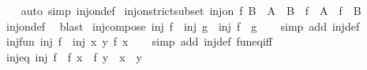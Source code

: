 \begin{isabellebody}
%
\isadelimproof
\ \ %
\endisadelimproof
%
\isatagproof
{}\isamarkupfalse%
\ {\isacharparenleft}{\kern0pt}auto\ simp{\isacharcolon}{\kern0pt}\ inj{\isacharunderscore}{\kern0pt}on{\isacharunderscore}{\kern0pt}def{\isacharparenright}{\kern0pt}%
\endisatagproof
{\isafoldproof}%
%
\isadelimproof
\isanewline
%
\endisadelimproof
\isanewline
{}\isamarkupfalse%
\ inj{\isacharunderscore}{\kern0pt}on{\isacharunderscore}{\kern0pt}strict{\isacharunderscore}{\kern0pt}subset{\isacharcolon}{\kern0pt}\ {\isachardoublequoteopen}inj{\isacharunderscore}{\kern0pt}on\ f\ B\ {\isasymLongrightarrow}\ A\ {\isasymsubset}\ B\ {\isasymLongrightarrow}\ f\ {\isacharbackquote}{\kern0pt}\ A\ {\isasymsubset}\ f\ {\isacharbackquote}{\kern0pt}\ B{\isachardoublequoteclose}\isanewline
%
\isadelimproof
\ \ %
\endisadelimproof
%
\isatagproof
{}\isamarkupfalse%
\ inj{\isacharunderscore}{\kern0pt}on{\isacharunderscore}{\kern0pt}def\ \isamarkupfalse%
\ blast%
\endisatagproof
{\isafoldproof}%
%
\isadelimproof
\isanewline
%
\endisadelimproof
\isanewline
{}\isamarkupfalse%
\ inj{\isacharunderscore}{\kern0pt}compose{\isacharcolon}{\kern0pt}\ {\isachardoublequoteopen}inj\ f\ {\isasymLongrightarrow}\ inj\ g\ {\isasymLongrightarrow}\ inj\ {\isacharparenleft}{\kern0pt}f\ {\isasymcirc}\ g{\isacharparenright}{\kern0pt}{\isachardoublequoteclose}\isanewline
%
\isadelimproof
\ \ %
\endisadelimproof
%
\isatagproof
{}\isamarkupfalse%
\ {\isacharparenleft}{\kern0pt}simp\ add{\isacharcolon}{\kern0pt}\ inj{\isacharunderscore}{\kern0pt}def{\isacharparenright}{\kern0pt}%
\endisatagproof
{\isafoldproof}%
%
\isadelimproof
\isanewline
%
\endisadelimproof
\isanewline
{}\isamarkupfalse%
\ inj{\isacharunderscore}{\kern0pt}fun{\isacharcolon}{\kern0pt}\ {\isachardoublequoteopen}inj\ f\ {\isasymLongrightarrow}\ inj\ {\isacharparenleft}{\kern0pt}{\isasymlambda}x\ y{\isachardot}{\kern0pt}\ f\ x{\isacharparenright}{\kern0pt}{\isachardoublequoteclose}\isanewline
%
\isadelimproof
\ \ %
\endisadelimproof
%
\isatagproof
{}\isamarkupfalse%
\ {\isacharparenleft}{\kern0pt}simp\ add{\isacharcolon}{\kern0pt}\ inj{\isacharunderscore}{\kern0pt}def\ fun{\isacharunderscore}{\kern0pt}eq{\isacharunderscore}{\kern0pt}iff{\isacharparenright}{\kern0pt}%
\endisatagproof
{\isafoldproof}%
%
\isadelimproof
\isanewline
%
\endisadelimproof
\isanewline
{}\isamarkupfalse%
\ inj{\isacharunderscore}{\kern0pt}eq{\isacharcolon}{\kern0pt}\ {\isachardoublequoteopen}inj\ f\ {\isasymLongrightarrow}\ f\ x\ {\isacharequal}{\kern0pt}\ f\ y\ {\isasymlongleftrightarrow}\ x\ {\isacharequal}{\kern0pt}\ y{\isachardoublequoteclose}\isanewline

\end{isabellebody}
